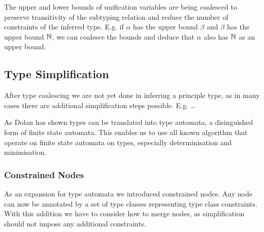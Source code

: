 The upper and lower bounds of unification variables are being coalesced to preserve transitivity of the subtyping relation and reduce the number of constraints of the inferred type.
E.g. if $\alpha$ has the upper bound $\beta$ and $\beta$ has the upper bound $\mathbb{N}$, we can coalesce the bounds and deduce that $\alpha$ also has $\mathbb{N}$ as an upper bound.

\subsection{Type Simplification}

After type coalescing we are not yet done in inferring a principle type, as in many cases there are additional simplification steps possible.
E.g. \dots

As Dolan has shown \cite{dolan2017subtyping} types can be translated into type automata, a disinguished form of finite state automata.
This enables us to use all known algorithm that operate on finite state automata on types, especially determinisation and minimisation.

\subsubsection{Constrained Nodes}

As an expansion for type automata we introduced constrained nodes.
Any node can now be annotated by a set of type classes representing type class constraints.
With this addition we have to consider how to merge nodes, as simplification should not impose any additional constraints.